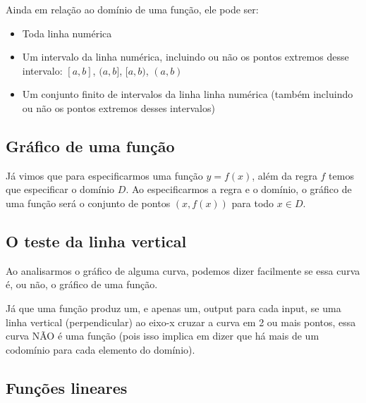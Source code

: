 \documentclass[pdftex, brazil, 12pt, twoside]{article}
\begin{document}
Ainda em relação ao domínio de uma função, ele pode ser:

\begin{itemize}[noitemsep]
\item Toda linha numérica
\item Um intervalo da linha numérica, incluindo ou não os pontos extremos desse intervalo:
  $[a,b]$, $(a,b]$, $[a,b)$, $(a,b)$
\item Um conjunto finito de intervalos da linha linha numérica (também incluindo ou não os pontos extremos desses intervalos)
\end{itemize}


\subsection{Gráfico de uma função}
\label{funcoes-grafico}

Já vimos que para especificarmos uma função $y = f(x)$, além da regra $f$ temos que
especificar o domínio $D$. Ao especificarmos a regra e o domínio, o gráfico de
uma função será o conjunto de pontos $(x, f(x))$ para todo $x \in D$.


\subsection{O teste da linha vertical}
\label{funcoes-teste-linha-vertical}

Ao analisarmos o gráfico de alguma curva, podemos dizer facilmente se essa curva
é, ou não, o gráfico de uma função.

Já que uma função produz um, e apenas um, output para cada input, se uma linha
vertical (perpendicular) ao eixo-x cruzar a curva em 2 ou mais pontos,
essa curva NÃO é uma função (pois isso implica em dizer que há mais de um codomínio
para cada elemento do domínio).

\subsection{Funções lineares}
\label{funcoes-lineares}
\end{document}

